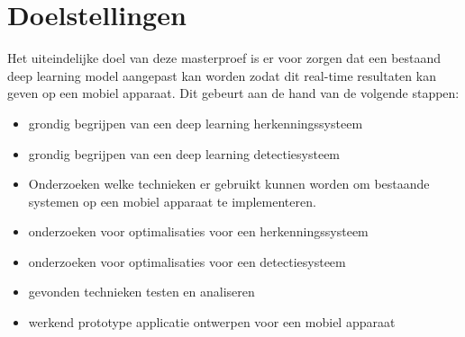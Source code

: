 \section{Doelstellingen}
Het uiteindelijke doel van deze masterproef is er voor zorgen dat een bestaand deep learning model aangepast kan worden zodat dit real-time resultaten kan geven op een mobiel apparaat. Dit gebeurt aan de hand van de volgende stappen:
\begin{itemize}
    \item grondig begrijpen van een deep learning herkenningssysteem
    \item grondig begrijpen van een deep learning detectiesysteem
    \item Onderzoeken welke technieken er gebruikt kunnen worden om bestaande systemen op een mobiel apparaat te implementeren.
    \item onderzoeken voor optimalisaties voor een herkenningssysteem
    \item onderzoeken voor optimalisaties voor een detectiesysteem
    \item gevonden technieken testen en analiseren
    \item werkend prototype applicatie ontwerpen voor een mobiel apparaat
\end{itemize}